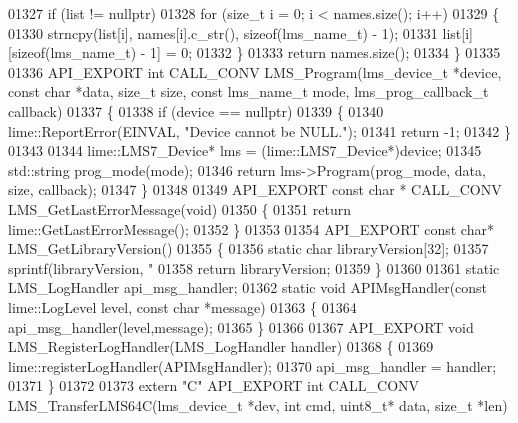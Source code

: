 \begin{DoxyCode}
01327     \textcolor{keywordflow}{if} (list != \textcolor{keyword}{nullptr})
01328         \textcolor{keywordflow}{for} (\textcolor{keywordtype}{size\_t} i = 0; i < names.size(); i++)
01329         \{
01330             strncpy(list[i], names[i].c\_str(), \textcolor{keyword}{sizeof}(lms_name_t) - 1);
01331             list[i][\textcolor{keyword}{sizeof}(lms_name_t) - 1] = 0;
01332         \}
01333     \textcolor{keywordflow}{return} names.size();
01334 \}
01335 
01336 API_EXPORT \textcolor{keywordtype}{int} CALL_CONV LMS_Program(lms_device_t *device, \textcolor{keyword}{const} \textcolor{keywordtype}{char} *data, \textcolor{keywordtype}{size\_t} 
      size, \textcolor{keyword}{const} lms_name_t mode, lms_prog_callback_t callback)
01337 \{
01338     \textcolor{keywordflow}{if} (device == \textcolor{keyword}{nullptr})
01339     \{
01340         lime::ReportError(EINVAL, \textcolor{stringliteral}{"Device cannot be NULL."});
01341         \textcolor{keywordflow}{return} -1;
01342     \}
01343 
01344     lime::LMS7_Device* lms = (lime::LMS7_Device*)device;
01345     std::string prog\_mode(mode);
01346     \textcolor{keywordflow}{return} lms->Program(prog\_mode, data, size, callback);
01347 \}
01348 
01349 API_EXPORT \textcolor{keyword}{const} \textcolor{keywordtype}{char} * CALL_CONV LMS_GetLastErrorMessage(\textcolor{keywordtype}{void})
01350 \{
01351     \textcolor{keywordflow}{return} lime::GetLastErrorMessage();
01352 \}
01353 
01354 API_EXPORT \textcolor{keyword}{const} \textcolor{keywordtype}{char}* LMS_GetLibraryVersion()
01355 \{
01356     \textcolor{keyword}{static} \textcolor{keywordtype}{char} libraryVersion[32];
01357     sprintf(libraryVersion, \textcolor{stringliteral}{"%
01358     \textcolor{keywordflow}{return} libraryVersion;
01359 \}
01360 
01361 \textcolor{keyword}{static} LMS_LogHandler api_msg_handler;
01362 \textcolor{keyword}{static} \textcolor{keywordtype}{void} APIMsgHandler(\textcolor{keyword}{const} lime::LogLevel level, \textcolor{keyword}{const} \textcolor{keywordtype}{char} *message)
01363 \{
01364     api_msg_handler(level,message);
01365 \}
01366 
01367 API_EXPORT \textcolor{keywordtype}{void} LMS_RegisterLogHandler(LMS_LogHandler handler)
01368 \{
01369     lime::registerLogHandler(APIMsgHandler);
01370     api_msg_handler = handler;
01371 \}
01372 
01373 \textcolor{keyword}{extern} \textcolor{stringliteral}{"C"} API_EXPORT \textcolor{keywordtype}{int} CALL_CONV LMS_TransferLMS64C(lms_device_t *dev, \textcolor{keywordtype}{int} cmd, uint8\_t* 
      data, \textcolor{keywordtype}{size\_t} *len)
}
\end{DoxyCode}
